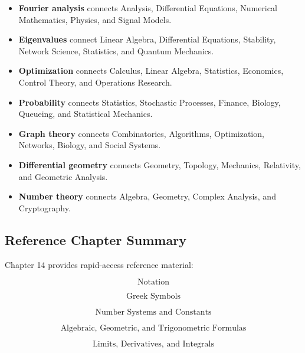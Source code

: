 \begin{itemize}

    \item \textbf{Fourier analysis}
    connects Analysis, Differential Equations, Numerical Mathematics,
    Physics, and Signal Models.

    \item \textbf{Eigenvalues}
    connect Linear Algebra, Differential Equations, Stability,
    Network Science, Statistics, and Quantum Mechanics.

    \item \textbf{Optimization}
    connects Calculus, Linear Algebra, Statistics, Economics,
    Control Theory, and Operations Research.

    \item \textbf{Probability}
    connects Statistics, Stochastic Processes, Finance, Biology,
    Queueing, and Statistical Mechanics.

    \item \textbf{Graph theory}
    connects Combinatorics, Algorithms, Optimization, Networks,
    Biology, and Social Systems.

    \item \textbf{Differential geometry}
    connects Geometry, Topology, Mechanics, Relativity,
    and Geometric Analysis.

    \item \textbf{Number theory}
    connects Algebra, Geometry, Complex Analysis, and Cryptography.

\end{itemize}

\subsection{Reference Chapter Summary}
\label{subsec:index-reference-summary}

Chapter 14 provides rapid-access reference material:

\[
\boxed{
\text{Notation}
}
\]

\[
\boxed{
\text{Greek Symbols}
}
\]

\[
\boxed{
\text{Number Systems and Constants}
}
\]

\[
\boxed{
\text{Algebraic, Geometric, and Trigonometric Formulas}
}
\]

\[
\boxed{
\text{Limits, Derivatives, and Integrals}
}
\]

